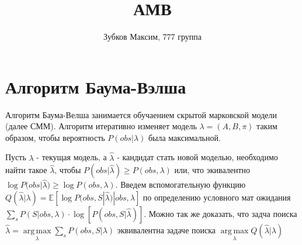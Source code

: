 \documentclass[a4paper,12pt]{article}
\title{АМВ}
\author{Зубков Максим, 777 группа}
\DeclareMathOperator*{\argmax}{arg\,max}
\begin{document}
\maketitle

\newcommand{\lineann}[5][0.5]{%
    \begin{scope}[rotate=#2, #5,inner sep=2pt]
        \draw[dashed, #5!40] (0,0) -- +(0,#1)
            node [coordinate, near end] (a) {};                       
        \draw[dashed, #5!20] (#3,0) -- +(0,#1)
            node [coordinate, near end] (b) {};
        \draw[|<->|] (a) -- node[fill=white] {#4} (b);
    \end{scope}
        
}
\maketitle


\section{Алгоритм Баума-Вэлша}

Алгоритм Баума-Велша занимается обучаением скрытой марковской модели (далее СММ). Алгоритм итеративно изменяет модель $\lambda = (A, B, \pi)$  таким образом, чтобы вероятность $P(obs | \lambda)$ была максимальной.

Пусть $\lambda$ - текущая модель, а $\widehat{\lambda}$ - кандидат стать новой моделью, необходимо найти такое $\widehat{\lambda}$, чтобы $P(obs |\widehat{\lambda} ) \geq P(obs, \lambda)$ или, что экивалентно $\log{P(obs |\widehat{\lambda} }) \geq \log {P(obs, \lambda)}$. Введем вспомогательную функцию  $Q(\widehat{\lambda} | \lambda) = \mathbb{E}\left[\log P(obs, S | \widehat{\lambda}) | obs, \lambda\right]$ по определению условного мат ожидания  $\sum_{s} P(S | obs, \lambda) \cdot \log \left[P(obs, S | \widehat{\lambda})\right]$. Можно так же доказать, что задча поиска $\widehat{\lambda} = \argmax\limits_{\lambda} \sum_{s} P(obs, S | \lambda)$ эквивалентна задаче поиска $\argmax\limits_{\lambda} Q(\widehat{\lambda} | \lambda)$
\end{document}
